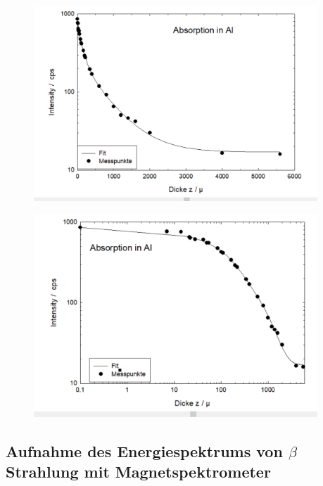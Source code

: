 \documentclass[12pt,english,ngerman]{scrartcl}
\begin{document}
\begin{figure}[H]
  \begin{center}
    \includegraphics[width = 0.95\textwidth]{figures/aluminiumabsorbtion.png}
  \end{center}
  \caption{}
  \label{fig:alu_absorption}
\end{figure}

\begin{figure}[H]
  \begin{center}
    \includegraphics[width = 0.95\textwidth]{figures/aluminiumdoppellog.png}
  \end{center}
  \caption{}
  \label{fig:alu_doppellog}
\end{figure}


\subsection{Aufnahme des Energiespektrums von \texorpdfstring{$\beta$}{beta}
Strahlung mit Magnetspektrometer}
\end{document}
